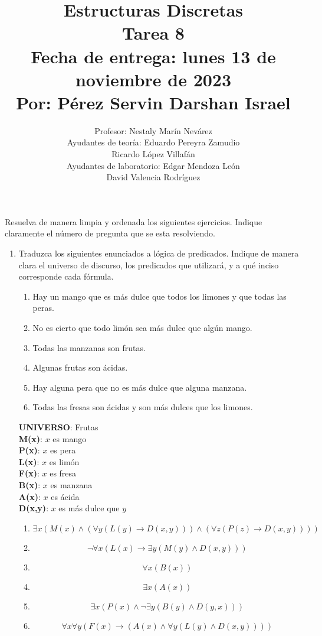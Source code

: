 \documentclass[a4paper,10pt]{article}
\title{Estructuras Discretas\\Tarea 8\\ Fecha de entrega: lunes 13 de noviembre de 2023\\ \textbf{Por: P\'erez Servin Darshan Israel}}
\author{Profesor: Nestaly Mar\'in Nev\'arez \\ Ayudantes de teor\'ia: Eduardo Pereyra Zamudio  \\ \phantom{Ayudantes de teor\'ia:} Ricardo L\'opez Villaf\'an \phantom{aa}\\ Ayudantes de laboratorio: Edgar Mendoza Le\'on \phantom{aaai}\\ \phantom{Ayudantes de laboratorio:} David Valencia Rodr\'iguez}
\date{}
\begin{document}
\maketitle

\vspace{-15pt}
Resuelva de manera limpia y ordenada los siguientes ejercicios. 
Indique claramente el n\'umero de pregunta que se esta resolviendo.


\begin{enumerate}

	\item {} Traduzca los siguientes enunciados a l\'ogica de predicados. 
Indique de manera clara el universo de discurso, los predicados que utilizar\'a, y a qu\'e inciso corresponde cada f\'ormula.
  \begin{enumerate}
    \item Hay un mango que es m\'as dulce que todos los limones y que todas las peras.
	  \item No es cierto que todo lim\'on sea m\'as dulce que alg\'un mango.
    \item Todas las manzanas son frutas.
    \item Algunas frutas son \'acidas.     
    \item Hay alguna pera que no es m\'as dulce que alguna manzana.
    \item Todas las fresas son \'acidas y son m\'as dulces que los limones.
  \end{enumerate}
    \textbf{UNIVERSO}: Frutas\\
    \textbf{M(x)}: $x$ es mango\\
    \textbf{P(x)}: $x$ es pera\\
    \textbf{L(x)}: $x$ es lim\'on\\
    \textbf{F(x)}: $x$ es fresa\\
    \textbf{B(x)}: $x$ es manzana\\
    
    \textbf{A(x)}: $x$ es \'acida\\
    \textbf{D(x,y)}: $x$ es m\'as dulce que $y$\\
    \begin{enumerate}
      \item $$\exists x (M(x) \land (\forall y (L(y) \to D(x,y))) \land (\forall z (P(z) \to D(x,y))))$$
      \item $$\neg \forall x (L(x) \to \exists y (M(y) \land D(x,y)))$$
      \item $$\forall x(B(x))$$
      \item $$\exists x(A(x))$$
      \item $$\exists x (P(x)  \land \neg \exists y (B(y) \land D(y,x)))$$
      \item $$\forall x \forall y (F(x) \to (A(x) \land \forall y (L(y) \land D(x,y))))$$
   \end{enumerate}
   

\end{enumerate}
\end{document}
